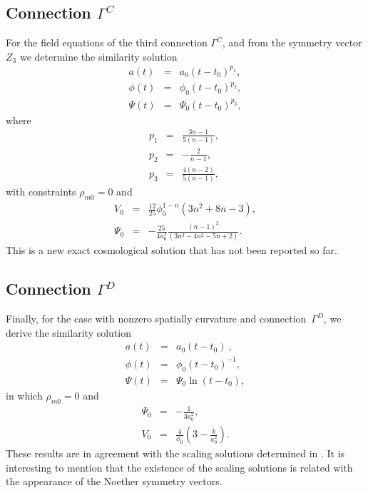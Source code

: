 \documentclass[onecolumn,superscriptaddress,secnumarabic,nobibnotes,aps,prd,nofootinbib,altaffilletter,11pt]{revtex4}
\begin{document}
\subsection{Connection $\Gamma ^{C}$}

For the field equations of the third connection $\Gamma ^{C}$, and from the
symmetry vector $Z_{3}$ we determine the similarity solution%
\begin{eqnarray}
a\left( t\right) &=&a_{0}\left( t-t_{0}\right) ^{p_{1}}, \\
\phi \left( t\right) &=&\phi _{0}\left( t-t_{0}\right) ^{p_{2}}, \\
\Psi \left( t\right) &=&\Psi _{0}\left( t-t_{0}\right) ^{p_{3}},
\end{eqnarray}%
where%
\begin{eqnarray}
p_{1} &=&\frac{3n-1}{5\left( n-1\right) },~ \\
p_{2} &=&-\frac{2}{n-1},~ \\
p_{3} &=&\frac{4\left( n-2\right) }{5\left( n-1\right) },
\end{eqnarray}%
with constraints $\rho _{m0}=0$ and 
\begin{eqnarray}
V_{0} &=&\frac{12}{25}\phi _{0}^{1-n}\left( 3n^{2}+8n-3\right) , \\
\Psi _{0} &=&-\frac{25}{4a_{0}^{2}}\frac{\left( n-1\right) ^{2}}{\left(
3n^{3}-4n^{2}-5n+2\right) }.
\end{eqnarray}
This is a new exact cosmological solution that has not been reported so far. 

\subsection{Connection $\Gamma ^{D}$}

Finally, for the case with nonzero spatially curvature and connection~$%
\Gamma ^{D}$, we derive the similarity solution%
\begin{eqnarray}
a\left( t\right) &=&a_{0}\left( t-t_{0}\right) ~, \\
\phi \left( t\right) &=&\phi _{0}\left( t-t_{0}\right) ^{-1}, \\
\Psi \left( t\right) &=&\Psi _{0}\ln \left( t-t_{0}\right) ,
\end{eqnarray}%
in which $\rho _{m0}=0$ and%
\begin{eqnarray}
\Psi _{0} &=&-\frac{1}{3a_{0}^{2}}, \\
V_{0} &=&\frac{4}{\phi _{0}}\left( 3-\frac{k}{a_{0}^{2}}\right) .
\end{eqnarray}%
These results are in agreement with the scaling solutions determined in \cite%
{ndim1}. It is interesting to mention that the existence of the scaling
solutions is related with the appearance of the Noether symmetry vectors.
\end{document}
